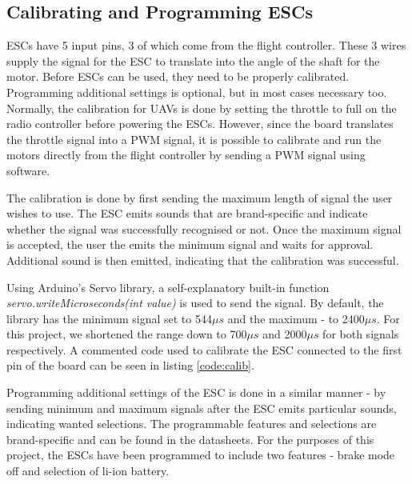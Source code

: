 \subsection{Calibrating and Programming ESCs}
ESCs have 5 input pins, 3 of which come from the flight controller. These 3 wires supply the signal for the ESC to translate into the angle of the shaft for the motor. Before ESCs can be used, they need to be properly calibrated. Programming additional settings is optional, but in most cases necessary too. Normally, the calibration for UAVs is done by setting the throttle to full on the radio controller before powering the ESCs. However, since the board translates the throttle signal into a PWM signal, it is possible to calibrate and run the motors directly from the flight controller by sending a PWM signal using software.

The calibration is done by first sending the maximum length of signal the user wishes to use. The ESC emits sounds that are brand-specific and indicate whether the signal was successfully recognised or not. Once the maximum signal is accepted, the user the emits the minimum signal and waits for approval. Additional sound is then emitted, indicating that the calibration was successful.

Using Arduino's Servo library, a self-explanatory built-in function \textit{servo.writeMicroseconds(int value)} is used to send the signal. By default, the library has the minimum signal set to 544$\mu s$ and the maximum - to 2400$\mu s$. For this project, we shortened the range down to 700$\mu s$ and 2000$\mu s$ for both signals respectively. A commented code used to calibrate the ESC connected to the first pin of the board can be seen in listing \ref{code:calib}.



Programming additional settings of the ESC is done in a similar manner - by sending minimum and maximum signals after the ESC emits particular sounds, indicating wanted selections. The programmable features and selections are brand-specific and can be found in the datasheets. For the purposes of this project, the ESCs have been programmed to include two features - brake mode off and selection of li-ion battery.


